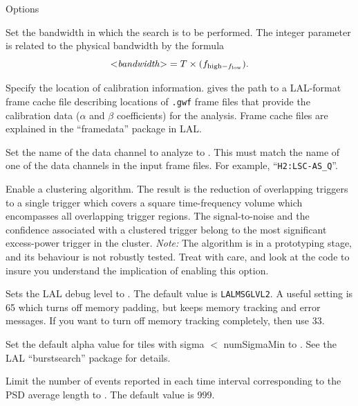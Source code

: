 \begin{entry}
\item[Options]\leavevmode
\begin{entry}
\item[\option{--bandwidth} \parm{bandwidth}]
Set the bandwidth in which the search is to be performed.  The integer
parameter  is related to the physical bandwidth by the
formula
\[
\mbox{$<$\textit{bandwidth}$>$}
   = T \times (f_{\mathrm{high} - f_{\mathrm{low}}}).
\]

\item[\option{--calibration-cache} \parm{cache file}]
Specify the location of calibration information.   gives
the path to a LAL-format frame cache file describing locations of
\texttt{.gwf} frame files that provide the calibration data ($\alpha$ and
$\beta$ coefficients) for the analysis.  Frame cache files are explained in
the ``framedata'' package in LAL.

\item[\option{--channel-name} \parm{string}]
Set the name of the data channel to analyze to .  This must
match the name of one of the data channels in the input frame files.  For
example, ``\verb|H2:LSC-AS_Q|''.

\item[\option{--cluster}]
Enable a clustering algorithm.  The result is the reduction of overlapping
triggers to a single trigger which covers a square time-frequency volume
which encompasses all overlapping trigger regions.   The signal-to-noise
and the confidence associated with a clustered trigger belong to the most
significant excess-power trigger in the cluster.  \emph{Note:}  The
algorithm is in a prototyping stage, and its behaviour is not robustly
tested.  Treat with care, and look at the code to insure you understand the
implication of enabling this option.

\item[\option{--debug-level} \parm{level}]
Sets the LAL debug level to .  The default value is
\texttt{LALMSGLVL2}.  A useful setting is 65 which turns off memory
padding, but keeps memory tracking and error messages.  If you want to turn
off memory tracking completely, then use 33.

\item[\option{--default-alpha} \parm{alpha}]
Set the default alpha value for tiles with sigma $<$ numSigmaMin to
.  See the LAL ``burstsearch'' package for details.

\item[\option{--event-limit} \parm{count}]
Limit the number of events reported in each time interval corresponding to
the PSD average length to .  The default value is 999.


\end{entry}
\end{entry}
